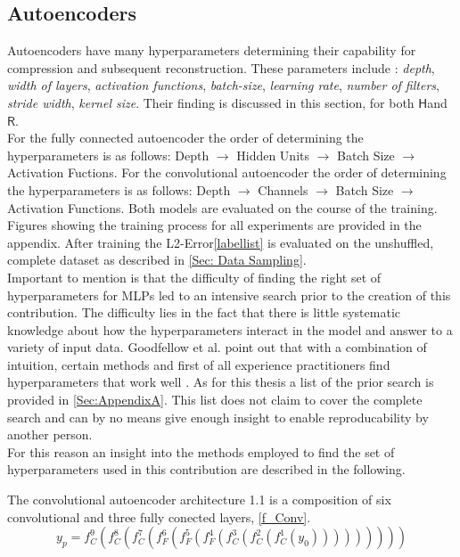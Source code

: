 \documentclass[12pt, a4paper]{article}
\newcommand{\hy}{\(\textsf{H}\)}
\newcommand{\rare}{\(\textsf{R}\)}
\begin{document}
\subsection{Autoencoders}
Autoencoders have many hyperparameters determining their capability for compression and subsequent reconstruction. These parameters include : \textit{depth}, \textit{width of layers}, \textit{activation functions}, \textit{batch-size}, \textit{learning rate}, \textit{number of filters}, \textit{stride width}, \textit{kernel size}. Their finding is discussed in this section, for both \hy and \rare.\\
For the fully connected autoencoder the order of determining the hyperparameters is as follows:
Depth $\rightarrow$ Hidden Units $\rightarrow$ Batch Size $\rightarrow$  Activation Fuctions.
For the convolutional autoencoder the order of determining the hyperparameters is as follows:
Depth $\rightarrow$ Channels $\rightarrow$ Batch Size $\rightarrow$ Activation Functions.
Both models are evaluated on the course of the training. Figures showing the training process for all experiments are provided in the appendix. After training the L2-Error\cref{labellist} is evaluated on the unshuffled, complete dataset as described in \cref{Sec: Data Sampling}.\\
Important to mention is that the difficulty of finding the right set of hyperparameters for MLPs led to an intensive search prior to the creation of this contribution. The difficulty lies in the fact that there is little systematic knowledge about how the hyperparameters interact in the model and answer to a variety of input data. Goodfellow et al. point out that with a combination of intuition, certain methods and first of all experience practitioners find hyperparameters that work well \cite{Goodfellow}. As for this thesis a list of the prior search is provided in \cref{Sec:AppendixA}. This list does not claim to cover the complete search and can by no means give enough insight to enable reproducability by another person.\\
For this reason an insight into the methods employed to find the set of hyperparameters used in this contribution are described in the following. 

The convolutional autoencoder architecture 1.1 is a composition of six convolutional and three fully conected layers, \cref{f_Conv}.
\begin{equation}
y_p = f_{C}^9(f_{C}^8(f_{C}^7(f_{F}^6(f_{F}^5(f_{F}^4(f_{C}^3(f_{C}^2(f_{C}^1(y_0)))))))))
\label{f_Conv}
\end{equation}
\end{document}
